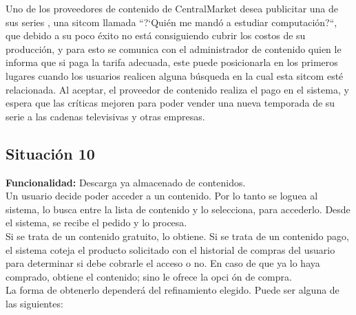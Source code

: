 \documentclass[11pt, a4paper, spanish]{article}
\begin{document}
	Uno de los proveedores de contenido de CentralMarket desea publicitar una de sus series , una sitcom llamada ``?`Qui\'en me mand\'o a estudiar    
   computaci\'on?``, que debido a su poco \'exito no est\'a consiguiendo cubrir los costos de su producci\'on, y para esto se comunica con el administrador de 
   contenido quien le informa que si paga la tarifa adecuada, este puede posicionarla en los primeros lugares cuando los usuarios realicen alguna    
   b\'usqueda en la cual esta sitcom est\'e relacionada. Al aceptar, el proveedor de contenido realiza el pago en el sistema, y espera que las cr\'iticas    
   mejoren para poder vender una nueva temporada de su serie a las cadenas televisivas y otras empresas. 


\subsection{Situaci\'on 10}

	\textbf{Funcionalidad:} Descarga ya almacenado de contenidos.\\

	Un usuario decide poder acceder a un contenido. Por lo tanto se loguea al sistema, lo busca entre la lista de contenido y lo selecciona, para 
   accederlo. Desde el sistema, se recibe el pedido y lo procesa.\\

       Si se trata de un contenido gratuito, lo obtiene. Si se trata de un contenido pago, el sistema coteja el producto solicitado con el historial de 
   compras del usuario para determinar si debe cobrarle el acceso o no. En caso de que ya lo haya comprado, obtiene el contenido; sino le ofrece la opci
   \'on de compra.\\
   La forma de obtenerlo depender\'a del refinamiento elegido. Puede ser alguna de las siguientes:
\end{document}
